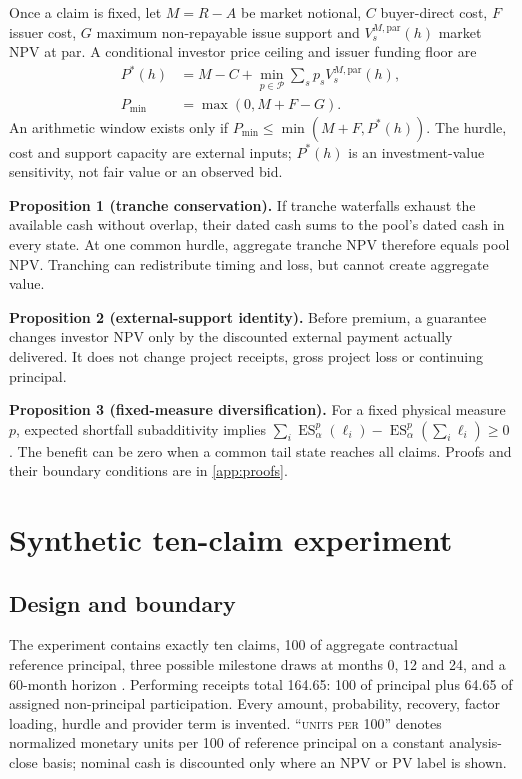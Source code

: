 \documentclass[11pt,a4paper]{article}
\newcommand{\demounit}{\textsc{units per 100}}
\begin{document}
Once a claim is fixed, let \(M=R-A\) be market notional, \(C\) buyer-direct cost, \(F\) issuer cost, \(G\) maximum non-repayable issue support and \(V^{M,\mathrm{par}}_s(h)\) market NPV at par. A conditional investor price ceiling and issuer funding floor are
\begin{align}
P^*(h)&=M-C+\min_{p\in\mathcal P}\sum_s p_sV^{M,\mathrm{par}}_s(h),\\
P_{\min}&=\max(0,M+F-G).
\label{eq:price-window}
\end{align}
An arithmetic window exists only if \(P_{\min}\leq\min(M+F,P^*(h))\). The hurdle, cost and support capacity are external inputs; \(P^*(h)\) is an investment-value sensitivity, not fair value or an observed bid.

\textbf{Proposition 1 (tranche conservation).} If tranche waterfalls exhaust the available cash without overlap, their dated cash sums to the pool's dated cash in every state. At one common hurdle, aggregate tranche NPV therefore equals pool NPV. Tranching can redistribute timing and loss, but cannot create aggregate value.

\textbf{Proposition 2 (external-support identity).} Before premium, a guarantee changes investor NPV only by the discounted external payment actually delivered. It does not change project receipts, gross project loss or continuing principal.

\textbf{Proposition 3 (fixed-measure diversification).} For a fixed physical measure \(p\), expected shortfall subadditivity implies \(\sum_i\operatorname{ES}^p_\alpha(\ell_i)-\operatorname{ES}^p_\alpha(\sum_i\ell_i)\geq0\). The benefit can be zero when a common tail state reaches all claims. Proofs and their boundary conditions are in \cref{app:proofs}.

\section{Synthetic ten-claim experiment}

\subsection{Design and boundary}

The experiment contains exactly ten claims, 100 of aggregate contractual reference principal, three possible milestone draws at months 0, 12 and 24, and a 60-month horizon \citep{fca2026analysis}. Performing receipts total 164.65: 100 of principal plus 64.65 of assigned non-principal participation. Every amount, probability, recovery, factor loading, hurdle and provider term is invented. ``\demounit{}'' denotes normalized monetary units per 100 of reference principal on a constant analysis-close basis; nominal cash is discounted only where an NPV or PV label is shown.
\end{document}
